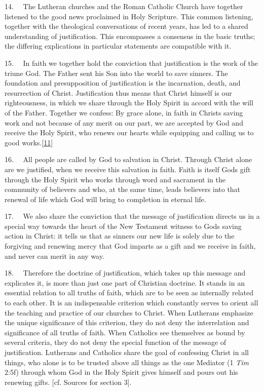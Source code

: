 14.~ ~The Lutheran churches and the Roman Catholic Church have together
listened to the good news proclaimed in Holy Scripture. This common
listening, together with the theological conversations of recent years,
has led to a shared understanding of justification. This encompasses a
consensus in the basic truths; the differing explications in particular
statements are compatible with it.

15.~ ~In faith we together hold the conviction that justification is the
work of the triune God. The Father sent his Son into the world to save
sinners. The foundation and presupposition of justification is the
incarnation, death, and resurrection of Christ. Justification thus means
that Christ himself is our righteousness, in which we share through the
Holy Spirit in accord with the will of the Father. Together we confess:
By grace alone, in faith in Christ\textquotesingle s saving work and not
because of any merit on our part, we are accepted by God and receive the
Holy Spirit, who renews our hearts while equipping and calling us to
good works.\label{r11}{}\hyperref[11]{{[}11{]}}

16.~ ~All people are called by God to salvation in Christ. Through
Christ alone are we justified, when we receive this salvation in faith.
Faith is itself God\textquotesingle s gift through the Holy Spirit who
works through word and sacrament in the community of believers and who,
at the same time, leads believers into that renewal of life which God
will bring to completion in eternal life.

17.~ ~We also share the conviction that the message of justification
directs us in a special way towards the heart of the New Testament
witness to God\textquotesingle s saving action in Christ: it tells us
that as sinners our new life is solely due to the forgiving and renewing
mercy that God imparts as a gift and we receive in faith, and never can
merit in any way.

18.~ ~Therefore the doctrine of justification, which takes up this
message and explicates it, is more than just one part of Christian
doctrine. It stands in an essential relation to all truths of faith,
which are to be seen as internally related to each other. It is an
indispensable criterion which constantly serves to orient all the
teaching and practice of our churches to Christ. When Lutherans
emphasize the unique significance of this criterion, they do not deny
the interrelation and significance of all truths of faith. When
Catholics see themselves as bound by several criteria, they do not deny
the special function of the message of justification. Lutherans and
Catholics share the goal of confessing Christ in all things, who alone
is to be trusted above all things as the one Mediator (1 \emph{Tim}
2:5f) through whom God in the Holy Spirit gives himself and pours out
his renewing gifts. {[}cf. Sources for section 3{]}.

